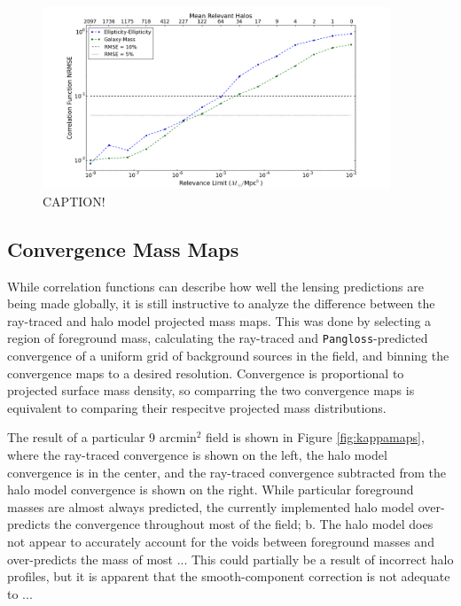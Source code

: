 \documentclass[%
 reprint,
 amsmath,amssymb,
 aps,nofootinbib
]{revtex4-1}
\begin{document}
\begin{figure}
    \centering
    \includegraphics[width=0.925\textwidth]{figs-swe/thesis/halo_fraction_long.png}
    \captionsetup{justification=raggedright,singlelinecheck=false}
    \caption{CAPTION!}
    \label{fig:halo_fraction}
\end{figure}



\subsection{Convergence Mass Maps} \label{mass_maps}

While correlation functions can describe how well the lensing predictions are being made globally, it is still instructive to analyze the difference between the ray-traced and halo model projected mass maps. This was done by selecting a region of foreground mass, calculating the ray-traced and \texttt{Pangloss}-predicted convergence of a uniform grid of background sources in the field, and binning the convergence maps to a desired resolution. Convergence is proportional to projected surface mass density, so comparring the two convergence maps is equivalent to comparing their respecitve projected mass distributions.

The result of a particular 9 arcmin$^2$ field is shown in Figure \ref{fig:kappamaps}, where the ray-traced convergence is shown on the left, the halo model convergence is in the center, and the ray-traced convergence subtracted from the halo model convergence is shown on the right. While particular foreground masses are almost always predicted, the currently implemented halo model over-predicts the convergence throughout most of the field; b. The halo model does not appear to accurately account for the voids between foreground masses and over-predicts the mass of most ... This could partially be a result of incorrect halo profiles, but it is apparent that the smooth-component correction is not adequate to ...
\end{document}
